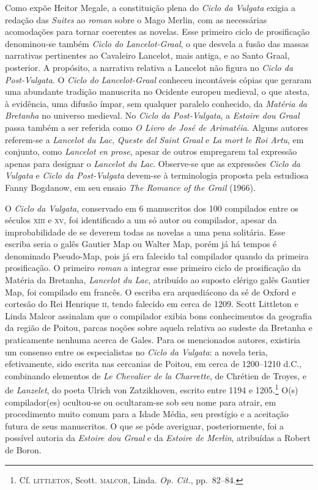 Como expõe Heitor Megale, a constituição plena do \textit{Ciclo da
Vulgata} exigia a redação das \textit{Suites} ao \textit{roman} sobre o
Mago Merlin, com as necessárias acomodações para tornar coerentes as
novelas. Esse primeiro ciclo de prosificação denominou-se também
\textit{Ciclo do} \textit{Lancelot-Graal}, o que desvela a fusão das
massas narrativas pertinentes ao Cavaleiro Lancelot, mais antiga, e ao
Santo Graal, posterior. A propósito, a narrativa relativa a Lancelot
não figura no \textit{Ciclo da Post-Vulgata}. O \textit{Ciclo do}
\textit{Lancelot-Graal} conheceu incontáveis cópias que geraram uma
abundante tradição manuscrita no Ocidente europeu medieval, o que
atesta, à evidência, uma difusão ímpar, sem qualquer paralelo
conhecido, da \textit{Matéria da Bretanha} no universo medieval. No
\textit{Ciclo da Post-Vulgata}, a \textit{Estoire dou Graal} passa
também a ser referida como \textit{O Livro de José de Arimatéia}.
Alguns autores referem-se a \textit{Lancelot du Lac}, \textit{Queste
del Saint Graal} e  \textit{La mort le Roi Artu}, em conjunto, como
\textit{Lancelot en prose}, apesar de outros empregarem tal expressão
apenas para designar o \textit{Lancelot du Lac}. Observe-se que as
expressões \textit{Ciclo da Vulgata} e \textit{Ciclo da Post-Vulgata}
devem-se à terminologia proposta pela estudiosa Fanny Bogdanow, em seu
ensaio \textit{The Romance of the Grail} (1966). 

O \textit{Ciclo da Vulgata}, conservado em 6 manuscritos dos 100
compilados entre os séculos \textsc{xiii} e \textsc{xv}, foi identificado a um só autor
ou compilador, apesar da improbabilidade de se deverem todas as novelas
a uma pena solitária. Esse escriba seria o galês Gautier Map ou Walter
Map, porém já há tempos é denominado Pseudo-Map, pois já era falecido
tal compilador quando da primeira prosificação. O primeiro
\textit{roman} a integrar esse primeiro ciclo de prosificação da
Matéria da Bretanha, \textit{Lancelot du Lac}, atribuído ao suposto
clérigo galês Gautier Map, foi compilado em francês. O escriba era
arquediácono da sé de Oxford e cortesão do Rei Henrique \textsc{ii}, tendo
falecido em cerca de 1209. Scott Littleton e Linda Malcor assinalam que
o compilador exibia bons conhecimentos da geografia da região de
Poitou, parcas noções sobre aquela relativa ao sudeste da Bretanha e
praticamente nenhuma acerca de Gales. Para os mencionados autores,
existiria um consenso entre os especialistas no \textit{Ciclo da
Vulgata}: a novela teria, efetivamente, sido escrita nas cercanias de
Poitou, em cerca de 1200--1210 d.C., combinando elementos de \textit{Le
Chevalier de la Charrette}, de Chrétien de Troyes, e de
\textit{Lanzelet}, do poeta Ulrich von Zatzikhoven, escrito entre 1194
e 1205.\footnote{ Cf. \textsc{littleton}, Scott. \textsc{malcor}, Linda. \textit{Op.
Cit.}, pp.~82--84.} O(s) compilador(es) ocultou-se ou ocultaram-se
sob seu nome para atrair, em procedimento muito comum para a Idade
Média, seu prestígio e a aceitação futura de seus manuscritos. O que se
pôde averiguar, posteriormente, foi a possível autoria da
\textit{Estoire dou Graal} e da \textit{Estoire de Merlin}, atribuídas
a Robert de Boron.

